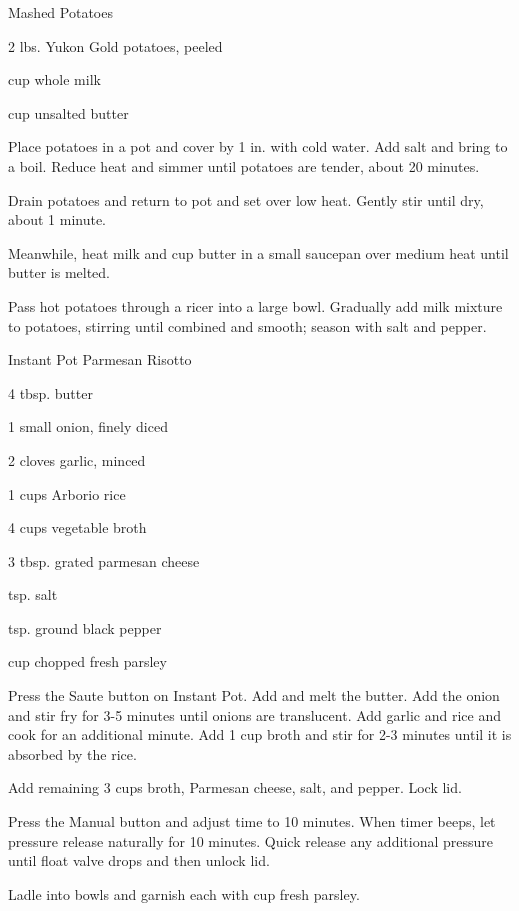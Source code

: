 \documentclass{cookbook}
\begin{document}
\begin{recipe}{Mashed Potatoes}

\begin{ingredients}
    \item 2 lbs. Yukon Gold potatoes, peeled
    \item {} cup whole milk
    \item {} cup unsalted butter
\end{ingredients}

Place potatoes in a pot and cover by 1 in. with cold water. Add salt and bring to a boil. Reduce heat and simmer until potatoes are tender, about 20 minutes.

Drain potatoes and return to pot and set over low heat. Gently stir until dry, about 1 minute.

Meanwhile, heat milk and  cup butter in a small saucepan over medium heat until butter is melted.

Pass hot potatoes through a ricer into a large bowl. Gradually add milk mixture to potatoes, stirring until combined and smooth; season with salt and pepper.

\end{recipe}

\begin{recipe}{Instant Pot Parmesan Risotto}

\begin{ingredients}
    \item 4 tbsp. butter
    \item 1 small onion, finely diced
    \item 2 cloves garlic, minced
    \item 1  cups Arborio rice
    \item 4 cups vegetable broth
    \item 3 tbsp. grated parmesan cheese
    \item {} tsp. salt
    \item {} tsp. ground black pepper
    \item {} cup chopped fresh parsley   
\end{ingredients}

Press the Saute button on Instant Pot. Add and melt the butter. Add the onion and stir fry for 3-5 minutes until onions are translucent. Add garlic and rice and cook for an additional minute. Add 1 cup broth and stir for 2-3 minutes until it is absorbed by the rice.

Add remaining 3 cups broth, Parmesan cheese, salt, and pepper. Lock lid.

Press the Manual button and adjust time to 10 minutes. When timer beeps, let pressure release naturally for 10 minutes. Quick release any additional pressure until float valve drops and then unlock lid.

Ladle into bowls and garnish each with  cup fresh parsley.

\end{recipe}
\end{document}
